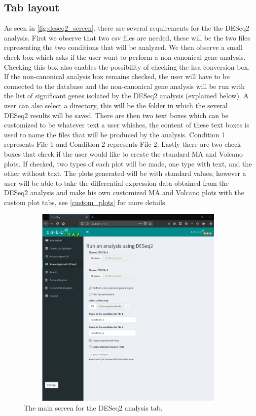 \documentclass[11pt]{article}
\begin{document}
\subsection{Tab layout \label{deseq2_layout}}
As seen in \autoref{fig:deseq2_screen}, there are several requirements for the the DESeq2 analysis. First we observe that two csv files are needed, these will be the two files representing the two conditions that will be analyzed. We then observe a small check box which asks if the user want to perform a non-canonical gene analysis. Checking this box also enables the possibility of checking the hsa conversion box. If the non-canonical analysis box remains checked, the user will have to be connected to the database and the non-canonical gene analysis will be run with the list of significant genes isolated by the DESeq2 analysis (explained below). A user can also select a directory, this will be the folder in which the several DESeq2 results will be saved.
There are then two text boxes which can be customized to be whatever text a user whishes, the content of these text boxes is used to name the files that will be produced by the analysis. Condition 1 represents File 1 and Condition 2 represents File 2.
Lastly there are two check boxes that check if the user would like to create the standard MA and Volcano plots. If checked, two types of each plot will be made, one type with text, and the other without text. The plots generated will be with standard values, however a user will be able to take the differential expression data obtained from the DESeq2 analysis and make his own customized MA and Volcano plots with the custom plot tabs, see \autoref{custom_plots} for more details.

\begin{figure}[h!]
\centering
\includegraphics[width=15cm,height=10cm,keepaspectratio]{deseq2_screen.png}
\caption{The main screen for the DESeq2 analysis tab.}
\label{fig:deseq2_screen}
\end{figure}
\end{document}

